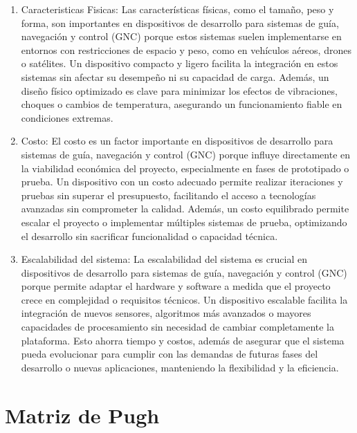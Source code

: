 \begin{enumerate}
    \item Caracteristicas Fisicas: Las características físicas, como el tamaño, peso y forma, son importantes en dispositivos de desarrollo para sistemas de guía, navegación y control (GNC) porque estos sistemas suelen implementarse en entornos con restricciones de espacio y peso, como en vehículos aéreos, drones o satélites. Un dispositivo compacto y ligero facilita la integración en estos sistemas sin afectar su desempeño ni su capacidad de carga. Además, un diseño físico optimizado es clave para minimizar los efectos de vibraciones, choques o cambios de temperatura, asegurando un funcionamiento fiable en condiciones extremas.

    \item Costo: El costo es un factor importante en dispositivos de desarrollo para sistemas de guía, navegación y control (GNC) porque influye directamente en la viabilidad económica del proyecto, especialmente en fases de prototipado o prueba. Un dispositivo con un costo adecuado permite realizar iteraciones y pruebas sin superar el presupuesto, facilitando el acceso a tecnologías avanzadas sin comprometer la calidad. Además, un costo equilibrado permite escalar el proyecto o implementar múltiples sistemas de prueba, optimizando el desarrollo sin sacrificar funcionalidad o capacidad técnica.

    \item Escalabilidad del sistema: 
    La escalabilidad del sistema es crucial en dispositivos de desarrollo para sistemas de guía, navegación y control (GNC) porque permite adaptar el hardware y software a medida que el proyecto crece en complejidad o requisitos técnicos. Un dispositivo escalable facilita la integración de nuevos sensores, algoritmos más avanzados o mayores capacidades de procesamiento sin necesidad de cambiar completamente la plataforma. Esto ahorra tiempo y costos, además de asegurar que el sistema pueda evolucionar para cumplir con las demandas de futuras fases del desarrollo o nuevas aplicaciones, manteniendo la flexibilidad y la eficiencia.

\end{enumerate}
\newpage

\section{Matriz de Pugh}


